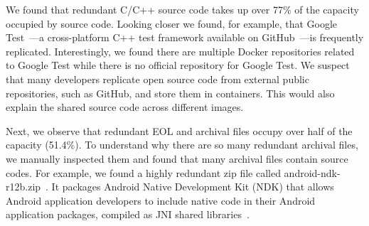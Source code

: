 We found that redundant C/C++ source code takes up over 77\% of the capacity
occupied by source code.
%
Looking closer we found, for example, that Google Test~\cite{googletest}---a
cross-platform C++ test framework available on GitHub~\cite{github}---is
frequently replicated.
%
%
Interestingly, we found there are multiple Docker repositories  related to Google Test while there is no official
repository for Google Test.
%
We suspect that many developers replicate open source code from external public
repositories, such as GitHub, and store them in containers.
%
This would also explain the shared source code across different images.
%
% 
%
%
%

Next, we observe that redundant EOL and archival files occupy over half of the
capacity (51.4\%). 
%
To understand why there are so many redundant archival files, we manually
inspected them and found that many archival files contain source codes.
%
%
For example, we found a highly redundant zip file called
android-ndk-r12b.zip~\cite{NDK}.
%
%
It packages Android Native Development Kit (NDK) that allows Android
application developers to include native code in their Android application
packages, compiled as JNI shared libraries~\cite{NDK}.
%
%
%
 

